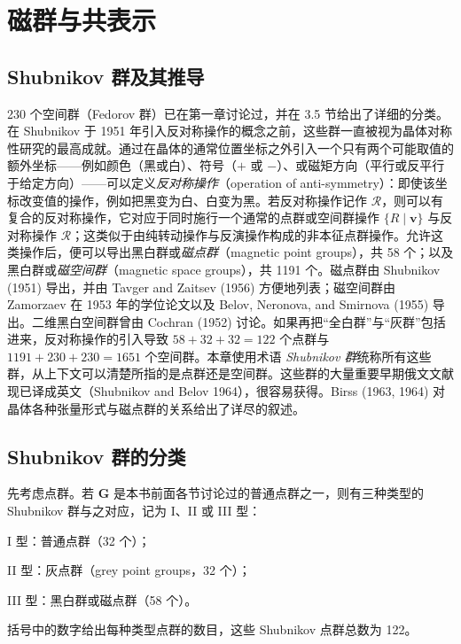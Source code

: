 \chapter{磁群与共表示}

\section{Shubnikov 群及其推导}

230 个空间群（Fedorov 群）已在第一章讨论过，并在 3.5 节给出了详细的分类。在 Shubnikov 于 1951 年引入反对称操作的概念之前，这些群一直被视为晶体对称性研究的最高成就。通过在晶体的通常位置坐标之外引入一个只有两个可能取值的额外坐标——例如颜色（黑或白）、符号（$+$ 或 $-$）、或磁矩方向（平行或反平行于给定方向）——可以定义\textit{反对称操作}（operation of anti-symmetry）：即使该坐标改变值的操作，例如把黑变为白、白变为黑。若反对称操作记作 $\mathcal{R}$，则可以有复合的反对称操作，它对应于同时施行一个通常的点群或空间群操作 $\{R \mid \mathbf{v}\}$ 与反对称操作 $\mathcal{R}$；这类似于由纯转动操作与反演操作构成的非本征点群操作。允许这类操作后，便可以导出黑白群或\textit{磁点群}（magnetic point groups），共 58 个；以及黑白群或\textit{磁空间群}（magnetic space groups），共 1191 个。磁点群由 Shubnikov (1951) 导出，并由 Tavger and Zaitsev (1956) 方便地列表；磁空间群由 Zamorzaev 在 1953 年的学位论文以及 Belov, Neronova, and Smirnova (1955) 导出。二维黑白空间群曾由 Cochran (1952) 讨论。如果再把“全白群”与“灰群”包括进来，反对称操作的引入导致 $58 + 32 + 32 = 122$ 个点群与 $1191 + 230 + 230 = 1651$ 个空间群。本章使用术语 \textit{Shubnikov 群}统称所有这些群，从上下文可以清楚所指的是点群还是空间群。这些群的大量重要早期俄文文献现已译成英文（Shubnikov and Belov 1964），很容易获得。Birss (1963, 1964) 对晶体各种张量形式与磁点群的关系给出了详尽的叙述。

\section{Shubnikov 群的分类}

先考虑点群。若 $\mathbf{G}$ 是本书前面各节讨论过的普通点群之一，则有三种类型的 Shubnikov 群与之对应，记为 I、II 或 III 型：

I 型：普通点群（32 个）；

II 型：灰点群（grey point groups，32 个）；

III 型：黑白群或磁点群（58 个）。

括号中的数字给出每种类型点群的数目，这些 Shubnikov 点群总数为 122。

